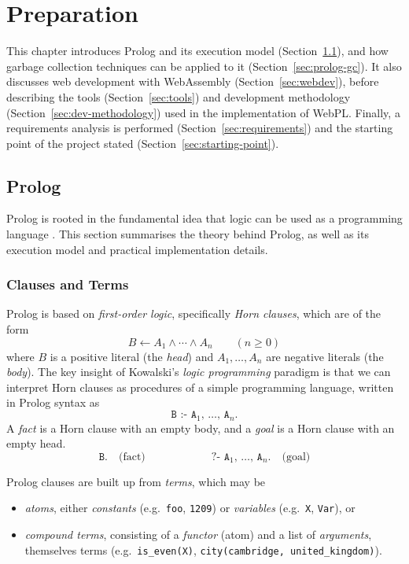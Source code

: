 
\chapter{Preparation}

This chapter introduces Prolog and its execution model (Section~\ref{sec:prolog}), and how garbage collection techniques can be applied to it (Section~\ref{sec:prolog-gc}). It also discusses web development with WebAssembly (Section~\ref{sec:webdev}), before describing the tools (Section~\ref{sec:tools}) and development methodology (Section~\ref{sec:dev-methodology}) used in the implementation of WebPL. Finally, a requirements analysis is performed (Section~\ref{sec:requirements}) and the starting point of the project stated (Section~\ref{sec:starting-point}).

\section{Prolog}

\label{sec:prolog}

Prolog is rooted in the fundamental idea that logic can be used as a programming language \cite{kowalskiPredicateLogicProgramming1974}. This section summarises the theory behind Prolog, as well as its execution model and practical implementation details.

\subsection{Clauses and Terms}

Prolog is based on \emph{first-order logic}, specifically \emph{Horn clauses}, which are of the form
$$
B \leftarrow A_1 \land \cdots \land A_n \qquad (n \geq 0)
$$
where $B$ is a positive literal (the \emph{head}) and $A_1, \ldots, A_n$ are negative literals (the \emph{body}). The key insight of Kowalski's \emph{logic programming} paradigm is that we can interpret Horn clauses as procedures of a simple programming language, written in Prolog syntax as
$$
\texttt{B :- A$_1$, $\ldots$, A$_n$.}
$$
A \emph{fact} is a Horn clause with an empty body, and a \emph{goal} is a Horn clause with an empty head.
$$
\texttt{B.} \quad \text{(fact)} \qquad\qquad\qquad \texttt{?- A$_1$, $\ldots$, A$_n$.} \quad \text{(goal)}
$$

Prolog clauses are built up from \emph{terms}, which may be
\begin{itemize}
\item \emph{atoms}, either \emph{constants} (e.g.\ \texttt{foo}, \texttt{1209}) or \emph{variables} (e.g.\ \texttt{X}, \texttt{Var}), or
\item \emph{compound terms}, consisting of a \emph{functor} (atom) and a list of \emph{arguments}, themselves terms (e.g.\ \texttt{is\_even(X)}, \texttt{city(cambridge, united\_kingdom)}).
\end{itemize}

